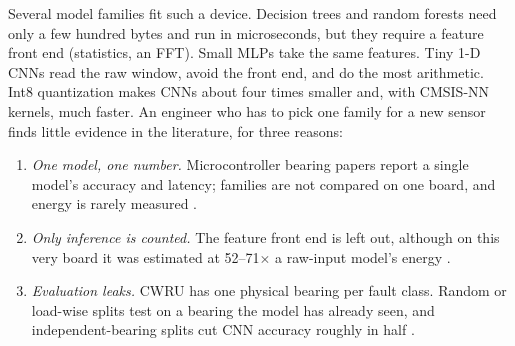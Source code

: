 \documentclass[conference]{IEEEtran}
\begin{document}
Several model families fit such a device. Decision trees and random forests need only a few hundred bytes and run in
microseconds, but they require a feature front end (statistics, an FFT). Small MLPs take the same features. Tiny 1-D
CNNs read the raw window, avoid the front end, and do the most arithmetic. Int8 quantization makes CNNs about four
times smaller and, with CMSIS-NN kernels, much faster. An engineer who has to pick one family for a new sensor finds
little evidence in the literature, for three reasons:
\begin{enumerate}
\item \emph{One model, one number.} Microcontroller bearing papers report a single model's accuracy and latency;
families are not compared on one board, and energy is rarely measured \cite{gao2025edge,elboughardini2026effective}.
\item \emph{Only inference is counted.} The feature front end is left out, although on this very board it was
estimated at 52--71$\times$ a raw-input model's energy \cite{muthumala2024comparison}.
\item \emph{Evaluation leaks.} CWRU has one physical bearing per fault class. Random or load-wise splits test on a
bearing the model has already seen, and independent-bearing splits cut CNN accuracy roughly in half
\cite{hendriks2022towards,vieira2026towards}.
\end{enumerate}
\end{document}
